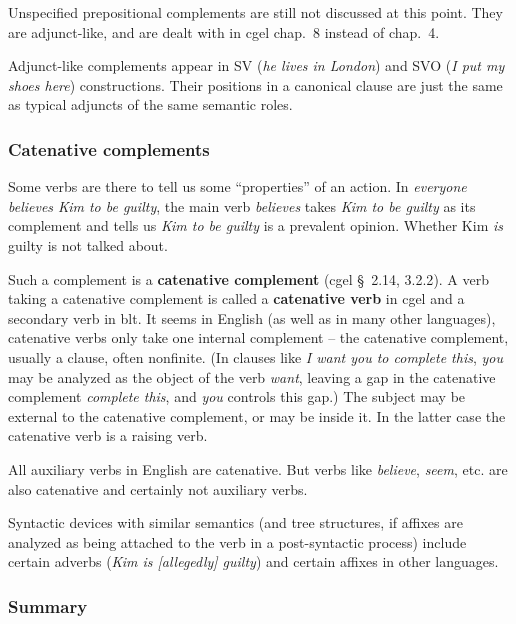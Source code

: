 \documentclass{article}
\newcommand*{\citesec}[1]{\S~{#1}}
\newcommand*{\citechap}[1]{chap.~{#1}}
\newcommand*{\concept}[1]{\textbf{#1}}
\newcommand*{\corpus}[1]{\emph{#1}}
\begin{document}
Unspecified prepositional complements are still not discussed at this point.
They are adjunct-like, and are dealt with in \ac{cgel} \citechap{8} instead of \citechap{4}.

Adjunct-like complements appear in SV (\corpus{he lives in London}) and 
SVO (\corpus{I put my shoes here}) constructions. %
Their positions in a canonical clause are just the same as typical adjuncts of the same semantic roles.

\subsubsection{Catenative complements}

Some verbs are there to tell us some ``properties'' of an action.
In \corpus{everyone believes Kim to be guilty},
the main verb \corpus{believes} takes \corpus{Kim to be guilty} as its complement
and tells us \corpus{Kim to be guilty} is a prevalent opinion.
Whether Kim \emph{is} guilty is not talked about.

Such a complement is a \concept{catenative complement} (\ac{cgel} \citesec{2.14, 3.2.2}).
A verb taking a catenative complement is called a \concept{catenative verb} in \ac{cgel} 
and a secondary verb in \ac{blt}.  
It seems in English (as well as in many other languages),
catenative verbs only take one internal complement 
-- the catenative complement, usually a clause, often nonfinite.
(In clauses like \corpus{I want you to complete this},
\corpus{you} may be analyzed as the object of the verb \corpus{want}, 
leaving a gap in the catenative complement \corpus{complete this},
and \corpus{you} controls this gap.)
The subject may be external to the catenative complement,
or may be inside it.
In the latter case the catenative verb is a raising verb. %

All auxiliary verbs in English are catenative. 
But verbs like \corpus{believe}, \corpus{seem}, etc. are also catenative and certainly not auxiliary verbs.

Syntactic devices with similar semantics 
(and tree structures, if affixes are analyzed as being attached to the verb in a post-syntactic process)
include certain adverbs (\corpus{Kim is [allegedly] guilty})
and certain affixes in other languages.

\subsubsection{Summary}
\end{document}
